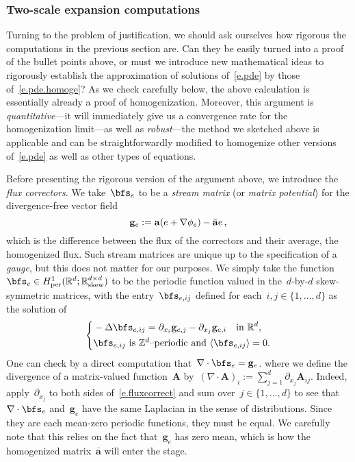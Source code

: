\documentclass[11pt,twoside]{article} %
\numberwithin{equation}{section}
\theoremstyle{definition}
\let\originalleft\left
\let\originalright\right
\renewcommand{\left}{\mathopen{}\mathclose\bgroup\originalleft}
\renewcommand{\right}{\aftergroup\egroup\originalright}
\newcommand*{\Z}{\ensuremath{\mathbb{Z}}}
\newcommand*{\R}{\ensuremath{\mathbb{R}}}
\newcommand{\per}{\mathrm{per}}
\renewcommand{\skew}{\mathrm{skew}}
\newcommand{\g}{\mathbf{g}}
\renewcommand{\a}{\mathbf{a}}
\newcommand{\ahom}{\bar{\a}}
\newcommand{\bfA}{\mathbf{A}}
\begin{document}
\subsubsection{Two-scale expansion computations}

Turning to the problem of justification, we should ask ourselves how rigorous the computations in the previous section are. Can they be easily turned into a proof of the bullet points above, or must we introduce new mathematical ideas to rigorously establish the approximation of solutions of~\eqref{e.pde} by those of~\eqref{e.pde.homoge}? As we check carefully below, the above calculation is essentially already a proof of homogenization. Moreover, this argument is \emph{quantitative}---it will immediately give us a convergence rate for the homogenization limit---as well as \emph{robust}---the method we sketched above is applicable and can be straightforwardly modified to homogenize other versions of~\eqref{e.pde} as well as other types of equations. 



Before presenting the rigorous version of the argument above, we introduce the \emph{flux correctors}. 
We  take~$\bfs_e$ to be a \emph{stream matrix} (or \emph{matrix potential}) for the divergence-free vector field
\begin{equation}
\g_e := \a\left( e + \nabla\phi_e   \right) - \ahom e\,,
\end{equation}
which is the difference between the flux of the correctors and their average, the homogenized flux. Such stream matrices are unique up to the specification of a \emph{gauge}, but this does not matter for our purposes. We simply take the function~$\bfs_e \in H^1_{\per}(\R^d;\R^{d\times d}_{\skew})$ to be the periodic function valued in the~$d$-by-$d$ skew-symmetric matrices, with the entry~$\bfs_{e,ij}$ defined for each~$i,j\in\{1,\ldots,d\}$ as the solution of  
\begin{equation}
\label{e.fluxcorrect}
\left\{
\begin{aligned}
&
-\Delta \bfs_{e,ij} = 
\partial_{x_i} \g_{e,j} 
-
\partial_{x_j} \g_{e,i}
\quad \mbox{in}  \ \R^d, \\
& \bfs_{e,ij}  \ \mbox{is~$\Z^d$--periodic and} \ \langle \bfs_{e,ij} \rangle = 0. 
\end{aligned}
\right. 
\end{equation}
One can check by a direct computation that~$\nabla \cdot \bfs_e  = \g_e$. where we define the divergence of a matrix-valued function~$\bfA$ by~$(\nabla \cdot \bfA)_i:= \sum_{j=1}^d \partial_{x_j} \bfA_{ij}$. 
Indeed, apply~$\partial_{x_j}$ to both sides of~\eqref{e.fluxcorrect} and sum over~$j \in \{1,\ldots,d\}$ to see that~$\nabla \cdot \bfs_e$ and~$\g_e$ have the same Laplacian in the sense of distributions. Since they are each mean-zero periodic functions, they must be equal. We carefully note that this relies on the fact that~$\g_e$ has zero mean, which is how the homogenized matrix~$\ahom$ will enter the stage. 
\end{document}
